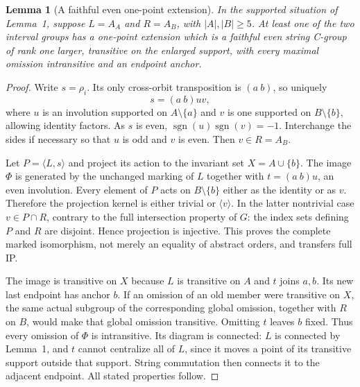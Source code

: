 \documentclass[11pt,a4paper]{article}
\newtheorem{lemma}{Lemma}
\newcommand{\gen}[1]{\langle#1\rangle}
\begin{document}
\begin{lemma}[A faithful even one-point extension]
In the supported situation of Lemma~1, suppose
$L=A_A$ and $R=A_B$, with $|A|,|B|\geq5$.
At least one of the two interval groups has a one-point
extension which is a faithful even string C-group of rank
one larger, transitive on the enlarged support, with every
maximal omission intransitive and an endpoint anchor.
\end{lemma}
\begin{proof}
Write $s=\rho_i$. Its only cross-orbit transposition is
$(a\ b)$, so uniquely
\[
                 s=(a\ b)u v,
\]
where $u$ is an involution supported on $A\setminus\{a\}$
and $v$ is one supported on $B\setminus\{b\}$, allowing
identity factors. As $s$ is even,
$\operatorname{sgn}(u)\operatorname{sgn}(v)=-1$.
Interchange the sides if necessary so that $u$ is odd and
$v$ is even. Then $v\in R=A_B$.

Let $P=\gen{L,s}$ and project its action to the invariant set
$X=A\cup\{b\}$. The image $\Phi$ is generated by the unchanged
marking of $L$ together with $t=(a\ b)u$, an even involution.
Every element of $P$ acts on $B\setminus\{b\}$ either as the
identity or as $v$. Therefore the projection kernel is either
trivial or $\gen v$. In the latter nontrivial case $v\in P\cap R$,
contrary to the full intersection property of $G$: the index
sets defining $P$ and $R$ are disjoint. Hence projection is
injective. This proves the complete marked isomorphism, not
merely an equality of abstract orders, and transfers full IP.

The image is transitive on $X$ because $L$ is transitive on
$A$ and $t$ joins $a,b$. Its new last endpoint has anchor $b$.
If an omission of an old member were transitive on $X$, the
same actual subgroup of the corresponding global omission,
together with $R$ on $B$, would make that global omission
transitive. Omitting $t$ leaves $b$ fixed. Thus every omission
of $\Phi$ is intransitive. Its diagram is connected: $L$ is
connected by Lemma~1, and $t$ cannot centralize all of $L$,
since it moves a point of its transitive support outside that
support. String commutation then connects it to the adjacent
endpoint. All stated properties follow.
\end{proof}
\end{document}
